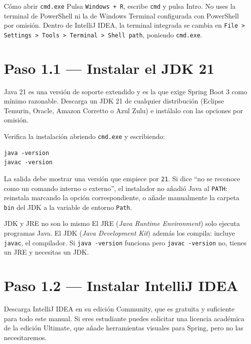 \documentclass[11pt,a4paper]{book}
\begin{document}
\begin{cajaTip}{Cómo abrir \texttt{cmd.exe}}
	Pulsa \texttt{Windows + R}, escribe \texttt{cmd} y pulsa Intro.
	No uses la terminal de PowerShell ni la de Windows Terminal configurada con PowerShell por omisión.
	Dentro de IntelliJ IDEA, la terminal integrada se cambia en \texttt{File > Settings > Tools > Terminal > Shell path}, poniendo \texttt{cmd.exe}.
\end{cajaTip}

\section{Paso 1.1 --- Instalar el JDK 21}

Java 21 es una versión de soporte extendido y es la que exige Spring Boot 3 como mínimo razonable.
Descarga un JDK 21 de cualquier distribución (Eclipse Temurin, Oracle, Amazon Corretto o Azul Zulu) e instálalo con las opciones por omisión.

Verifica la instalación abriendo \texttt{cmd.exe} y escribiendo:

\begin{lstlisting}[language=consola,caption={Verificación del JDK},label={lst:verjdk}]
java -version
javac -version
\end{lstlisting}

La salida debe mostrar una versión que empiece por \texttt{21}.
Si dice ``no se reconoce como un comando interno o externo'', el instalador no añadió Java al \texttt{PATH}: reinstala marcando la opción correspondiente, o añade manualmente la carpeta \texttt{bin} del JDK a la variable de entorno \texttt{Path}.

\begin{cajaNota}{JDK y JRE no son lo mismo}
	El JRE (\emph{Java Runtime Environment}) solo ejecuta programas Java.
	El JDK (\emph{Java Development Kit}) además los compila: incluye \texttt{javac}, el compilador.
	Si \texttt{java -version} funciona pero \texttt{javac -version} no, tienes un JRE y necesitas un JDK.
\end{cajaNota}

\section{Paso 1.2 --- Instalar IntelliJ IDEA}

Descarga IntelliJ IDEA en su edición Community, que es gratuita y suficiente para todo este manual.
Si eres estudiante puedes solicitar una licencia académica de la edición Ultimate, que añade herramientas visuales para Spring, pero no las necesitaremos.
\end{document}
